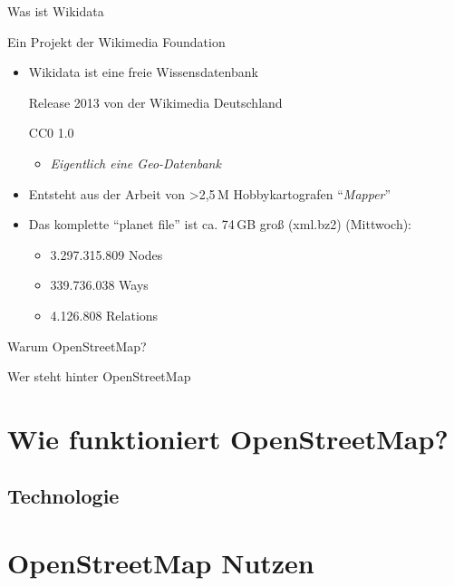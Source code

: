 \documentclass{beamer}
\begin{document}
\begin{frame}{Was ist Wikidata}

Ein Projekt der Wikimedia Foundation

\begin{itemize}
  \item Wikidata ist eine freie Wissensdatenbank

    Release 2013 von der Wikimedia Deutschland


    CC0 1.0



    \begin{itemize}
      \item \emph{Eigentlich eine Geo-Datenbank}
    \end{itemize}
\pause
  \item Entsteht aus der Arbeit von \textgreater 2,5\,M Hobbykartografen "`\emph{Mapper}"'

 \item Das komplette "`planet file"' ist ca. 74\,GB groß (xml.bz2) (Mittwoch):
  \begin{itemize}
    \item 3.297.315.809 Nodes
    \item 339.736.038 Ways
    \item 4.126.808 Relations
  \end{itemize}


\end{itemize}

\end{frame}

\begin{frame}{Warum OpenStreetMap?}

\end{frame}


\begin{frame}{Wer steht hinter OpenStreetMap}


\end{frame}

\section{Wie funktioniert OpenStreetMap?}

\subsection{Technologie}

\section{OpenStreetMap Nutzen}
\end{document}
